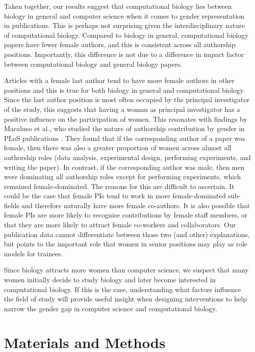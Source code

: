 \documentclass[10pt,letterpaper]{article}
\begin{document}
\begin{flushleft}
Taken together, our results suggest that computational biology lies between biology in general and computer science when it comes to gender representation in publications. This is perhaps not surprising given the interdisciplinary nature of computational biology. Compared to biology in general, computational biology papers have fewer female authors, and this is consistent across all authorship positions. Importantly, this difference is not due to a difference in impact factor between computational biology and general biology papers.

Articles with a female last author tend to have more female authors in other positions and this is true for both biology in general and computational biology.  Since the last author position is most often occupied by the principal investigator of the study, this suggests that having a woman as principal investigator has a positive influence on the participation of women. This resonates with findings by Macaluso et al., who studied the nature of authorship contribution by gender in PLoS publications \cite{Macaluso2016}. They found that if the corresponding author of a paper was female, then there was also a greater proportion of women across almost all authorship roles (data analysis, experimental design, performing experiments, and writing the paper). In contrast, if the corresponding author was male, then men were dominating all authorship roles except for performing experiments, which remained female-dominated. The reasons for this are difficult to ascertain. It could be the case that female PIs tend to work in more female-dominated sub-fields and therefore naturally have more female co-authors. It is also possible that female PIs are more likely to recognise contributions by female staff members, or that they are more likely to attract female co-workers and collaborators. Our publication data cannot differentiate between those two (and other) explanations, but points to the important role that women in senior positions may play as role models for trainees.

Since biology attracts more women than computer science, we suspect that many women initially decide to study biology and later become interested in computational biology. If this is the case, understanding what factors influence the field of study will provide useful insight when designing interventions to help narrow the gender gap in computer science and computational biology.

\section*{Materials and Methods}


\end{flushleft}
\end{document}
